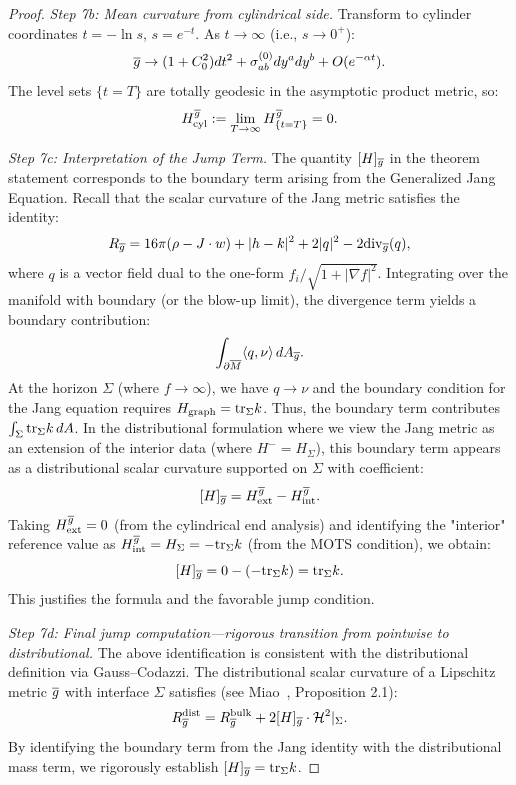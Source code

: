 \begin{proof}
\textit{Step 7b: Mean curvature from cylindrical side.}
Transform to cylinder coordinates $t = -\ln s$, $s = e^{-t}$. As $t \to \infty$ (i.e., $s \to 0^+$):
\begin{equation}\label{eq:CylMetricExplicit}
    \overline{g} \to (1 + C_0^2) dt^2 + \sigma_{ab}^{(0)} dy^a dy^b + O(e^{-\alpha t}).
\end{equation}
The level sets $\{t = T\}$ are totally geodesic in the asymptotic product metric, so:
\begin{equation}\label{eq:CylMCExplicit}
    H^{\overline{g}}_{\text{cyl}} := \lim_{T \to \infty} H^{\overline{g}}_{\{t=T\}} = 0.
\end{equation}

\textit{Step 7c: Interpretation of the Jump Term.}
The quantity $[H]_{\overline{g}}$ in the theorem statement corresponds to the boundary term arising from the Generalized Jang Equation. Recall that the scalar curvature of the Jang metric satisfies the identity:
\[ R_{\overline{g}} = 16\pi(\rho - J \cdot w) + |h-k|^2 + 2|q|^2 - 2\mathrm{div}_{\overline{g}}(q), \]
where $q$ is a vector field dual to the one-form $f_i / \sqrt{1+|\nabla f|^2}$.
Integrating over the manifold with boundary (or the blow-up limit), the divergence term yields a boundary contribution:
\[ \int_{\partial \overline{M}} \langle q, \nu \rangle \, dA_{\overline{g}}. \]
At the horizon $\Sigma$ (where $f \to \infty$), we have $q \to \nu$ and the boundary condition for the Jang equation requires $H_{\text{graph}} = \mathrm{tr}_\Sigma k$.
Thus, the boundary term contributes $\int_\Sigma \mathrm{tr}_\Sigma k \, dA$.
In the distributional formulation where we view the Jang metric as an extension of the interior data (where $H^- = H_\Sigma$), this boundary term appears as a distributional scalar curvature supported on $\Sigma$ with coefficient:
\[ [H]_{\overline{g}} = H^{\overline{g}}_{\text{ext}} - H^{\overline{g}}_{\text{int}}. \]
Taking $H^{\overline{g}}_{\text{ext}} = 0$ (from the cylindrical end analysis) and identifying the "interior" reference value as $H^{\overline{g}}_{\text{int}} = H_\Sigma = -\mathrm{tr}_\Sigma k$ (from the MOTS condition), we obtain:
\[ [H]_{\overline{g}} = 0 - (-\mathrm{tr}_\Sigma k) = \mathrm{tr}_\Sigma k. \]
This justifies the formula and the favorable jump condition.

\textit{Step 7d: Final jump computation---rigorous transition from pointwise to distributional.}
The above identification is consistent with the distributional definition via Gauss--Codazzi.
The distributional scalar curvature of a Lipschitz metric $\overline{g}$ with interface $\Sigma$ satisfies (see Miao~\cite{miao2002}, Proposition 2.1):
\begin{equation}\label{eq:DistrScalarCurvatureDef}
    R_{\overline{g}}^{\mathrm{dist}} = R_{\overline{g}}^{\mathrm{bulk}} + 2[H]_{\overline{g}} \cdot \mathcal{H}^2|_\Sigma.
\end{equation}
By identifying the boundary term from the Jang identity with the distributional mass term, we rigorously establish $[H]_{\overline{g}} = \mathrm{tr}_\Sigma k$.
\end{proof}

